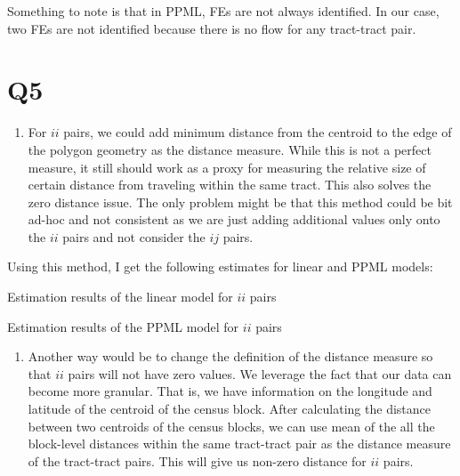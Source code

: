 \documentclass[
  11pt]{article}
\providecommand{\tightlist}{%
  \setlength{\itemsep}{0pt}\setlength{\parskip}{0pt}}
\begin{document}
Something to note is that in PPML, FEs are not always identified. In our
case, two FEs are not identified because there is no flow for any
tract-tract pair.

\section*{Q5}\label{q5}

\begin{enumerate}
\def\labelenumi{\arabic{enumi}.}
\tightlist
\item
  For \(ii\) pairs, we could add minimum distance from the centroid to
  the edge of the polygon geometry as the distance measure. While this
  is not a perfect measure, it still should work as a proxy for
  measuring the relative size of certain distance from traveling within
  the same tract. This also solves the zero distance issue. The only
  problem might be that this method could be bit ad-hoc and not
  consistent as we are just adding additional values only onto the
  \(ii\) pairs and not consider the \(ij\) pairs.
\end{enumerate}

Using this method, I get the following estimates for linear and PPML
models:

\begin{table}[!ht]
\centering
\caption{Estimation results of the linear model for $ii$ pairs}
\label{tab:est_linear_ii}

\end{table}

\begin{table}[!ht]
\centering
\caption{Estimation results of the PPML model for $ii$ pairs}
\label{tab:est_ppml_ii}

\end{table}

\begin{enumerate}
\def\labelenumi{\arabic{enumi}.}
\setcounter{enumi}{1}
\tightlist
\item
  Another way would be to change the definition of the distance measure
  so that \(ii\) pairs will not have zero values. We leverage the fact
  that our data can become more granular. That is, we have information
  on the longitude and latitude of the centroid of the census block.
  After calculating the distance between two centroids of the census
  blocks, we can use mean of the all the block-level distances within
  the same tract-tract pair as the distance measure of the tract-tract
  pairs. This will give us non-zero distance for \(ii\) pairs.
\end{enumerate}
\end{document}
